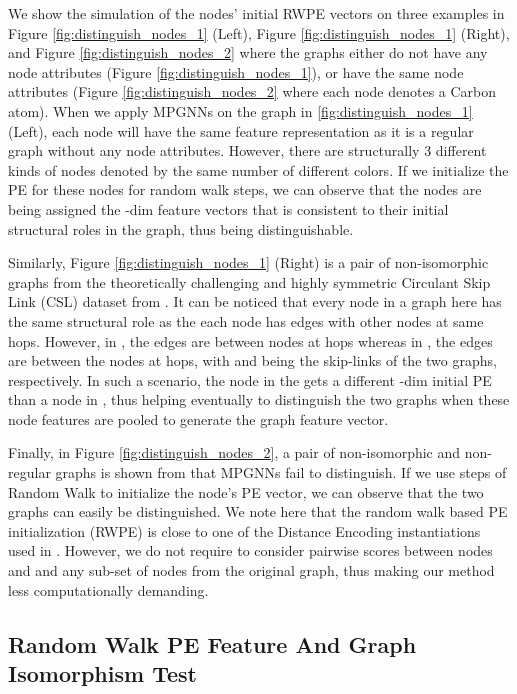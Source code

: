 \documentclass{article} \usepackage{iclr2021_conference,times}
\begin{document}
We show the simulation of the nodes' initial RWPE vectors on three examples in Figure \ref{fig:distinguish_nodes_1} (Left), Figure \ref{fig:distinguish_nodes_1} (Right), and Figure \ref{fig:distinguish_nodes_2} where the graphs either do not have any node attributes (Figure \ref{fig:distinguish_nodes_1}), or have the same node attributes (Figure \ref{fig:distinguish_nodes_2} where each node denotes a Carbon atom). When we apply MPGNNs on the graph in \ref{fig:distinguish_nodes_1} (Left), each node will have the same feature representation as it is a regular graph without any node attributes. However, there are structurally 3 different kinds of nodes denoted by the same number of different colors. If we initialize the PE for these nodes for  random walk steps, we can observe that the nodes are being assigned the -dim feature vectors that is consistent to their initial structural roles in the graph, thus being distinguishable. 

Similarly, Figure \ref{fig:distinguish_nodes_1} (Right) is a pair of non-isomorphic graphs from the theoretically challenging and highly symmetric Circulant Skip Link (CSL) dataset from \cite{murphy2019relational}. It can be noticed that every node in a graph here has the same structural role as the each node has edges with other nodes at same hops. However, in , the edges are between nodes at  hops whereas in , the edges are between the nodes at  hops, with  and  being the skip-links of the two graphs, respectively. In such a scenario, the node in the  gets a different -dim initial PE than a node in , thus helping eventually to distinguish the two graphs when these node features are pooled to generate the graph feature vector. 

Finally, in Figure \ref{fig:distinguish_nodes_2}, a pair of non-isomorphic and non-regular graphs is shown from \cite{sato2020survey} that MPGNNs fail to distinguish. 
If we use  steps of Random Walk to initialize the node's PE vector, we can observe that the two graphs can easily be distinguished. We note here that the random walk based PE initialization (RWPE) is close to one of the Distance Encoding instantiations used in \cite{li2020distance}. However, we do not require to consider pairwise scores  between nodes  and  and any sub-set of nodes from the original graph, thus making our method less computationally demanding.



\subsection{Random Walk PE Feature And Graph Isomorphism Test}
\label{sec:supplementary_algo}
\end{document}
